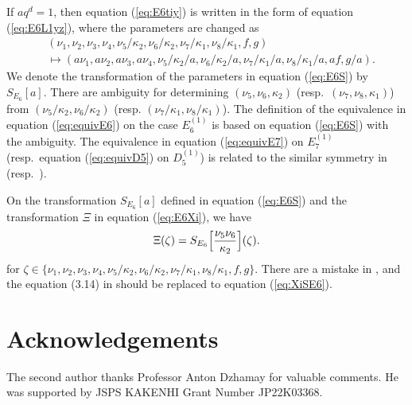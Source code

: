 \documentclass[12pt]{amsart}
\numberwithin{equation}{section}
\theoremstyle{definition}
\begin{document}
If $a q^d =1$, then equation (\ref{eq:E6tiy}) is written in the form of equation (\ref{eq:E6L1yz}), where the parameters are changed as 
\begin{align}
& (\nu_1 , \nu_2 , \nu_3 , \nu_4 , \nu_5/\kappa_2 ,\nu_6/\kappa_2 , \nu_7/\kappa_1 ,\nu_8/\kappa_1,f,g) \label{eq:E6S} \\
& \mapsto (a  \nu_1 , a \nu_2 , a \nu_3 , a \nu_4 , \nu_5/\kappa_2/a  ,\nu_6/\kappa_2 /a , \nu_7/\kappa_1 /a ,\nu_8/\kappa_1 /a ,af,g/a) . \nonumber
\end{align}
We denote the transformation of the parameters in equation (\ref{eq:E6S}) by $S_{E_6}[a] $.
There are ambiguity for determining $(\nu _5, \nu _6, \kappa _2)$ (resp.~$(\nu _7, \nu _8, \kappa _1)$) from $(\nu_5/\kappa_2 ,\nu_6/\kappa_2  )$ (resp. $(\nu _7/\kappa _1 , \nu _8 /\kappa _1)$).
The definition of the equivalence in equation (\ref{eq:equivE6}) on the case $E^{(1)}_6$ is based on equation (\ref{eq:E6S}) with the ambiguity.
The equivalence in equation (\ref{eq:equivE7}) on $E^{(1)}_7$ (resp.~equation (\ref{eq:equivD5}) on $D^{(1)}_5$) is related to the similar symmetry in \cite[(4.7)]{TsqP} (resp.~\cite[(2.10), (2.12)]{TsqP}).

On the transformation $S_{E_6}[a] $ defined in equation (\ref{eq:E6S}) and the transformation $\Xi $ in equation (\ref{eq:E6Xi}), we have
\begin{equation}
 \Xi (\zeta ) = S_{E_6} \Bigl[  \frac{ \nu_ 5 \nu_ 6 }{\kappa_2 }  \Bigr](\zeta ). \label{eq:XiSE6}
\end{equation}
for $\zeta \in \{ \nu_1, \nu_2, \nu_3 ,  \nu_4, \nu_5 /\kappa _2, \nu_6 /\kappa _2,  \nu_7 /\kappa _1, \nu_8 /\kappa _1, f, g \} $.
There are a mistake in \cite[Theorem 3.1 (ii)]{TsqP},
and the equation (3.14) in \cite{TsqP} should be replaced to equation (\ref{eq:XiSE6}).


\section*{Acknowledgements}
The second author thanks Professor Anton Dzhamay for valuable comments.
He was supported by JSPS KAKENHI Grant Number JP22K03368.

%
\end{document}
